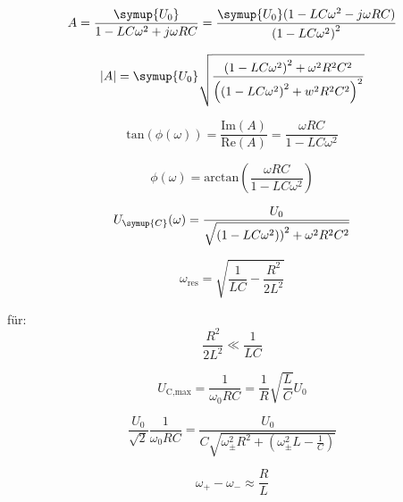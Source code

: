     \begin{equation}
        A= \frac{\symup{U_0}}{1 - LC \omega^2 + j \omega RC} = \frac{ \symup{U_0}(1 -LC \omega^2 - j\omega RC)}{\left( 1- LC \omega^2 \right)^2} \nonumber
    \end{equation}
    
    \begin{equation}
        |A|= \symup{U_0} \sqrt{\frac{\left(1-LC\omega^2\right)^2 + \omega^2 R^2C^2}{\left( \left(1 -LC \omega^2\right)^2 +w^2R^2C^2 \right)^2}} \nonumber
    \end{equation}

    \begin{equation}
        \text{tan}(\phi (\omega)) = \frac{\text{Im}(A)}{\text{Re}(A)} = \frac{\omega RC}{1 - LC\omega^2} \nonumber
    \end{equation}

    \begin{equation}
        \phi (\omega) = \text{arctan}\left(\frac{\omega RC}{1 - LC\omega^2} \right) \nonumber
    \end{equation}

    \begin{equation}
        U_{\symup{C}}(\omega) = \frac{U_0}{\sqrt{\left(1-LC\omega^2)\right)^2 + \omega^2 R^2 C^2}} \nonumber
    \end{equation}

    \begin{equation}
        \omega_{\text{res}} = \sqrt{\frac{1}{LC}-\frac{R^2}{2L^2}} \nonumber
    \end{equation}

    für: 
    \begin{equation}
        \frac{R^2}{2L^2} \ll \frac{1}{LC} \nonumber
    \end{equation}

    \begin{equation}
        U_{\text{C,max}} = \frac{1}{\omega_0 RC} = \frac{1}{R} \sqrt{\frac{L}{C}} U_0 \nonumber
    \end{equation}

    \begin{equation}
        \frac{U_0}{\sqrt{2}} \frac{1}{\omega_0 RC} = \frac{U_0}{C \sqrt{\omega^2_{\pm} R^2 + \left( \omega^2_{\pm}L - \frac{1}{C} \right) }} \nonumber
    \end{equation}

    \begin{equation}
        \omega_+ - \omega_- \approx \frac{R}{L} \nonumber
    \end{equation}

